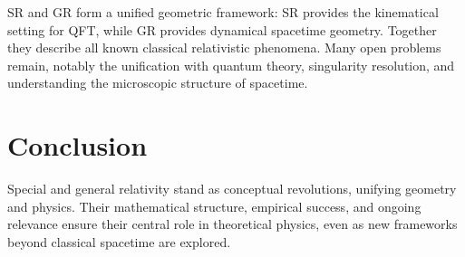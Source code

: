 \documentclass[12pt]{article}
\begin{document}
SR and GR form a unified geometric framework: SR provides the kinematical
setting for QFT, while GR provides dynamical spacetime geometry. Together 
they describe all known classical relativistic phenomena. 
Many open problems remain, notably the unification with quantum theory, 
singularity resolution, and understanding the microscopic structure of 
spacetime.

\section{Conclusion}

Special and general relativity stand as conceptual revolutions, unifying 
geometry and physics. Their mathematical structure, empirical success, and 
ongoing relevance ensure their central role in theoretical physics, even as 
new frameworks beyond classical spacetime are explored.
\end{document}
